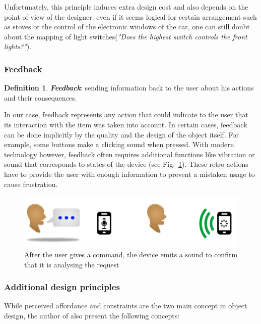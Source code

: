 \documentclass[a4paper,11pt] {article}
\theoremstyle{definition}
\begin{document}
Unfortunately, this principle induces extra design cost and also depends on the point of view of the designer: even if it seems logical for certain arrangement such as stoves or the control of the electronic windows of the car, one can still doubt about the mapping of light switches(\textit{"Does the highest switch controls the front lights?"}).

    \subsubsection{Feedback}
\newtheorem{mydef}{Definition}
\begin{mydef}
\textit{\textbf{Feedback}}: sending information back to the user about his actions and their consequences.
\cite{Norman02}
\end{mydef}

In our case, feedback represents any action that could indicate to the user that its interaction with the item was taken into account. In certain cases, feedback can be done implicitly by the quality and the design of the object itself. For example, some buttons make a clicking sound when pressed. With modern technology however, feedback often requires additional functions like vibration or sound that corresponds to states of the device (see Fig.~\ref{fig:feedback}). These retro-actions have to provide the user with enough information to prevent a mistaken usage to cause frustration.

\begin{figure}[h]
\centering
\includegraphics[scale=0.5]{fig-report/retro-action-speaking.jpg}
\caption{After the user gives a command, the device emits a sound to confirm that it is analysing the request}
\label{fig:feedback}
\end{figure}

    \subsubsection{Additional design principles}

While perceived affordance and constraints are the two main concept in object design, the author of \cite{Norman02} also present the following concepts:
\end{document}
